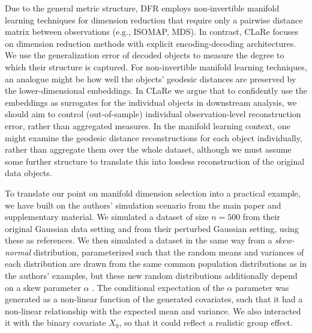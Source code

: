 Due to the general metric structure, DFR employs non-invertible manifold learning techniques for dimension reduction that require only a pairwise distance matrix between observations (e.g., ISOMAP, MDS).
In contrast, CLaRe focuses on dimension reduction methods with explicit encoding-decoding architectures.
We use the generalization error of decoded objects to measure the degree to which their structure is captured.
For non-invertible manifold learning techniques, an analogue might be how well the objects' geodesic distances are preserved by the lower-dimensional embeddings.
In CLaRe we argue that to confidently use the embeddings as surrogates for the individual objects in downstream analysis, we should aim to control (out-of-sample) individual observation-level reconstruction error, rather than aggregated measures.
In the manifold learning context, one might examine the geodesic distance reconstructions for each object individually, rather than aggregate them over the whole dataset, although we must assume some further structure to translate this into lossless reconstruction of the original data objects.

To translate our point on manifold dimension selection into a practical example, we have built on the authors' simulation scenario from the main paper and supplementary material.
We simulated a dataset of size $n=500$ from their original Gaussian data setting and from their perturbed Gaussian setting, using these as references.
We then simulated a dataset in the same way from a \emph{skew-normal} distribution, parameterized such that the random means and variances of each distribution are drawn from the same common population distributions as in the authors' examples, but these new random distributions additionally depend on a skew parameter $\alpha$ \parencite{azzalini_skew-normal_2013}.
The conditional expectation of the $\alpha$ parameter was generated as a non-linear function of the generated covariates, such that it had a non-linear relationship with the expected mean and variance. 
We also interacted it with the binary covariate $X_9$, so that it could reflect a realistic group effect.


